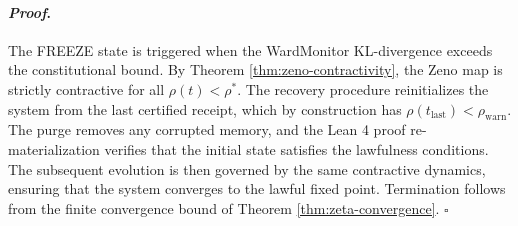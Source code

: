 \documentclass[12pt]{article}
\theoremstyle{plain}
\theoremstyle{definition}
\theoremstyle{remark}
\renewenvironment{proof}{\paragraph{\textit{Proof}.}}{\hfill$\square$}
\begin{document}
\begin{proof}
The FREEZE state is triggered when the WardMonitor KL-divergence exceeds the constitutional bound. By Theorem \ref{thm:zeno-contractivity}, the Zeno map is strictly contractive for all $\rho(t) < \rho^*$. The recovery procedure reinitializes the system from the last certified receipt, which by construction has $\rho(t_{\text{last}}) < \rho_{\text{warn}}$. The purge removes any corrupted memory, and the Lean 4 proof re-materialization verifies that the initial state satisfies the lawfulness conditions. The subsequent evolution is then governed by the same contractive dynamics, ensuring that the system converges to the lawful fixed point. Termination follows from the finite convergence bound of Theorem \ref{thm:zeta-convergence}.
\end{proof}

\nocite{*}


\end{document}
